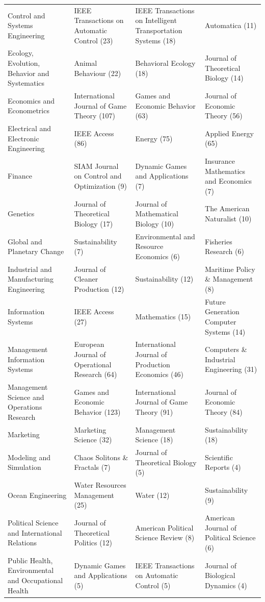 \documentclass[
  12pt,
]{article}
\begin{document}
\begin{longtable}[t]{>{\raggedright\arraybackslash}p{4cm}>{\raggedright\arraybackslash}p{4cm}>{\raggedright\arraybackslash}p{4cm}>{\raggedright\arraybackslash}p{4cm}}
Control and Systems Engineering & IEEE Transactions on Automatic Control (23) & IEEE Transactions on Intelligent Transportation Systems (18) & Automatica (11)\\
Ecology, Evolution, Behavior and Systematics & Animal Behaviour (22) & Behavioral Ecology (18) & Journal of Theoretical Biology (14)\\
Economics and Econometrics & International Journal of Game Theory (107) & Games and Economic Behavior (63) & Journal of Economic Theory (56)\\
Electrical and Electronic Engineering & IEEE Access (86) & Energy (75) & Applied Energy (65)\\
Finance & SIAM Journal on Control and Optimization (9) & Dynamic Games and Applications (7) & Insurance Mathematics and Economics (7)\\
Genetics & Journal of Theoretical Biology (17) & Journal of Mathematical Biology (10) & The American Naturalist (10)\\
Global and Planetary Change & Sustainability (7) & Environmental and Resource Economics (6) & Fisheries Research (6)\\
Industrial and Manufacturing Engineering & Journal of Cleaner Production (12) & Sustainability (12) & Maritime Policy \& Management (8)\\
Information Systems & IEEE Access (27) & Mathematics (15) & Future Generation Computer Systems (14)\\
Management Information Systems & European Journal of Operational Research (64) & International Journal of Production Economics (46) & Computers \& Industrial Engineering (31)\\
Management Science and Operations Research & Games and Economic Behavior (123) & International Journal of Game Theory (91) & Journal of Economic Theory (84)\\
Marketing & Marketing Science (32) & Management Science (18) & Sustainability (18)\\
Modeling and Simulation & Chaos Solitons \& Fractals (7) & Journal of Theoretical Biology (5) & Scientific Reports (4)\\
Ocean Engineering & Water Resources Management (25) & Water (12) & Sustainability (9)\\
Political Science and International Relations & Journal of Theoretical Politics (12) & American Political Science Review (8) & American Journal of Political Science (6)\\
Public Health, Environmental and Occupational Health & Dynamic Games and Applications (5) & IEEE Transactions on Automatic Control (5) & Journal of Biological Dynamics (4)\\

\end{longtable}
\end{document}
